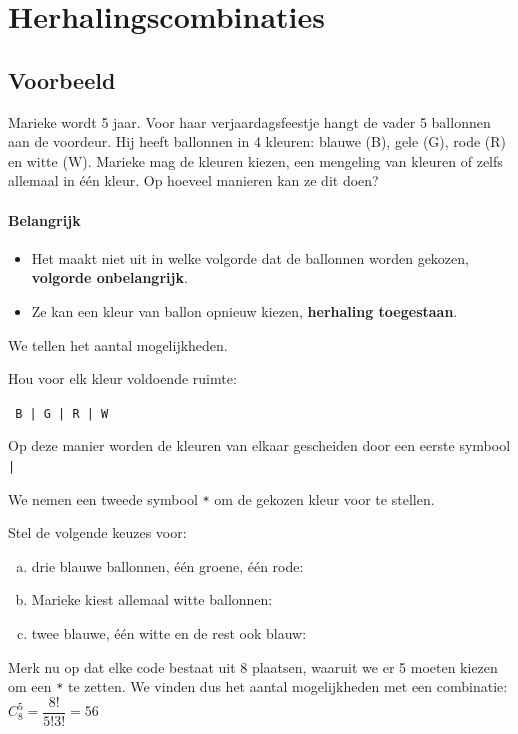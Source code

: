 \documentclass[12pt,twoside]{article}
\begin{document}
\pagebreak
\section{Herhalingscombinaties}

\begin{theorie}

\subsection{Voorbeeld}

Marieke wordt 5 jaar. Voor haar verjaardagsfeestje hangt de vader 5 ballonnen aan de voordeur. Hij heeft ballonnen in 4 kleuren: blauwe (B), gele (G), rode (R) en witte (W). Marieke mag de kleuren kiezen, een mengeling van kleuren of zelfs allemaal in één kleur. Op hoeveel manieren kan ze dit doen?

\paragraph*{Belangrijk}
\begin{itemize}
  \item Het maakt niet uit in welke volgorde dat de ballonnen worden gekozen, {\bf volgorde onbelangrijk}.
  \item Ze kan een kleur van ballon opnieuw kiezen, {\bf herhaling toegestaan}.
\end{itemize}

We tellen het aantal mogelijkheden.

Hou voor elk kleur voldoende ruimte:

\verb# B | G | R | W #

Op deze manier worden de kleuren van elkaar gescheiden door een eerste symbool \verb#|#

We nemen een tweede symbool \verb#*# om de gekozen kleur voor te stellen.

Stel de volgende keuzes voor:
\begin{enumerate}[(a)]
  \item drie blauwe ballonnen, één groene, één rode: \arulefill
  \item Marieke kiest allemaal witte ballonnen: \arulefill
  \item twee blauwe, één witte en de rest ook blauw: \arulefill
\end{enumerate}

Merk nu op dat elke code bestaat uit 8 plaatsen, waaruit we er 5 moeten kiezen om een \verb#*# te zetten. We vinden dus het aantal mogelijkheden met een combinatie: $C^5_8=\dfrac{8!}{5!3!}=56$


\end{theorie}
\end{document}
